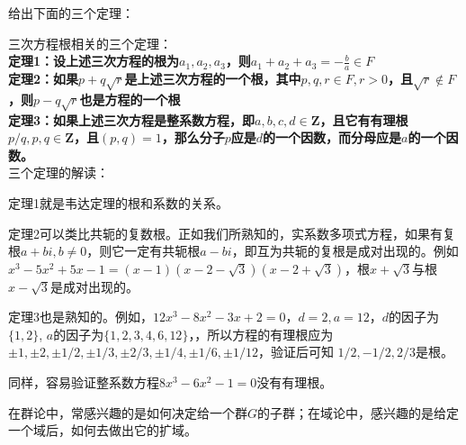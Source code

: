 \documentclass[12pt]{article}
\begin{document}
给出下面的三个定理：
\begin{mdframed}[
linecolor=black!40,outerlinewidth=1pt,roundcorner=.5em,innertopmargin=1ex,innerbottommargin=.5\baselineskip,innerrightmargin=1em,innerleftmargin=1em,backgroundcolor=gray!5,
]
三次方程根相关的三个定理：
~\\

\textbf{
定理1：设上述三次方程的根为$a_1, a_2, a_3$，则$a_1 + a_2 + a_3 = -\frac{b}{a} \in F$
}
~\\

\textbf{
定理2：如果$p + q\sqrt{r}$是上述三次方程的一个根，其中$p, q, r \in F, r > 0$，且$\sqrt{r} \notin F$，则$p - q\sqrt{r}$也是方程的一个根
}
~\\

\textbf{
定理3：如果上述三次方程是整系数方程，即$a, b, c, d \in \mathbf{Z}$，且它有有理根$p/q, p, q \in \mathbf{Z}$，且$(p,q) = 1$，那么分子$p$应是$d$的一个因数，而分母应是$a$的一个因数。
}
\\

三个定理的解读：

定理1就是韦达定理的根和系数的关系。

定理2可以类比共轭的复数根。正如我们所熟知的，实系数多项式方程，如果有复根$a+bi, b \neq 0$，则它一定有共轭根$a - bi$，即互为共轭的复根是成对出现的。例如 $x^3 - 5x^2 + 5x - 1 = (x-1)(x - 2 - \sqrt{3})(x - 2 + \sqrt{3})$，根$x + \sqrt{3}$与根$x - \sqrt{3}$是成对出现的。

定理3也是熟知的。例如，$12x^3 - 8x^2 - 3x + 2 = 0$，$d = 2, a = 12$，$d$的因子为$\{1, 2\}$, $a$的因子为$\{1, 2, 3, 4, 6, 12\}$，，所以方程的有理根应为$\pm 1,  \pm 2, \pm 1/2, \pm 1/3, \pm 2/3, \pm 1/4, \pm 1/6, \pm 1/12$，验证后可知 $1/2, -1/2, 2/3$是根。

同样，容易验证整系数方程$8x^3 - 6x^2 - 1 = 0$没有有理根。
\end{mdframed}

在群论中，常感兴趣的是如何决定给一个群$G$的子群；在域论中，感兴趣的是给定一个域后，如何去做出它的扩域。




\end{document}
